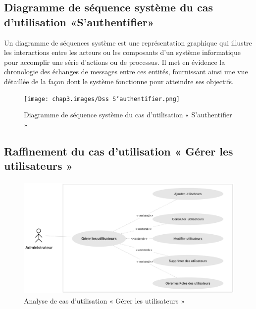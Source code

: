 \newpage
\subsection{Diagramme de séquence système du cas d’utilisation «S’authentifier»}
Un diagramme de séquences système est une représentation graphique qui illustre les interactions entre les acteurs ou les composants d'un système informatique pour accomplir une série d'actions ou de processus. Il met en évidence la chronologie des échanges de messages entre ces entités, fournissant ainsi une vue détaillée de la façon dont le système fonctionne pour atteindre ses objectifs.

\bigskip
\begin{figure}[ht!]
  \centering
  \texttt{[image: chap3.images/Dss S’authentifier.png]}
  \caption{Diagramme de séquence système du cas d’utilisation « S’authentifier » }

\end{figure}

\newpage

\subsection{Raffinement du cas d'utilisation « Gérer les utilisateurs »}

\begin{figure}[ht!]
  \centering
  \includegraphics[width=1\textwidth,height=6cm]{chap3.images/gerer raf sprint 1.png}
  \caption{Analyse de cas d’utilisation « Gérer les utilisateurs »}

\end{figure}



